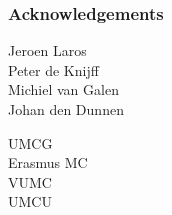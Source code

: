 \documentclass[slidestop,14pt]{beamer}
\begin{document}

\lastpagetemplate
\begin{frame}
  \frametitle{Acknowledgements}

  \vspace{\baselineskip}

  Jeroen Laros\\
  Peter de Knijff\\
  Michiel van Galen\\
  Johan den Dunnen

  \vspace{\baselineskip}

  UMCG\\
  Erasmus MC\\
  VUMC\\
  UMCU
\end{frame}
\end{document}
